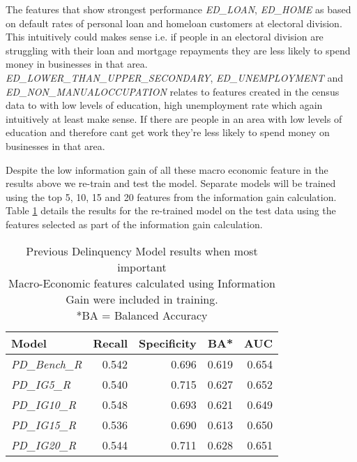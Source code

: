 The features that show strongest performance \textit{ED\_LOAN}, \textit{ED\_HOME} as based on default rates of personal loan and homeloan customers at electoral division. This intuitively could makes sense i.e. if people in an electoral division are struggling with their loan and mortgage repayments they are less likely to spend money in businesses in that area. \textit{ED\_LOWER\_THAN\_UPPER\_SECONDARY}, \textit{ED\_UNEMPLOYMENT} and \textit{ED\_NON\_MANUALOCCUPATION} relates to features created in the census data to with low levels of education, high unemployment rate which again intuitively at least make sense. If there are people in an area with low levels of education and therefore cant get work they're less likely to spend money on businesses in that area.

Despite the low information gain of all these macro economic feature in the results above we re-train and test the model. Separate models will be trained using the top 5, 10, 15 and 20 features from the information gain calculation. Table \ref{table:InfoGainPDModelResults} details the results for the re-trained model on the test data using the features selected as part of the information gain calculation.

\begin{table}[H]
\centering
\small
		\begin{tabular}{l r r r r}
			\hline
			\textbf{Model} & \textbf{Recall} & \textbf{Specificity} & \textbf{BA*} & \textbf{AUC}  \\ \hline
			\textit{PD\_Bench\_R} & 0.542 & 0.696 & 0.619 & \cellcolor{green!25}0.654 \\ \hline
			\textit{PD\_IG5\_R} & 0.540 & \cellcolor{green!25}0.715 & 0.627 & 0.652   \\ 
			\textit{PD\_IG10\_R} & \cellcolor{green!25}0.548 & 0.693 & 0.621 & 0.649  \\ 
			\textit{PD\_IG15\_R} & 0.536 & 0.690 & 0.613 & 0.650  \\
			\textit{PD\_IG20\_R} & 0.544 & 0.711 & \cellcolor{green!25}0.628 & 0.651 \\\hline 
		\end{tabular}
	\caption{Previous Delinquency Model results when most important \\Macro-Economic features calculated using Information Gain were included in training.\\
		*BA = Balanced Accuracy}
	\label{table:InfoGainPDModelResults}
\end{table}

